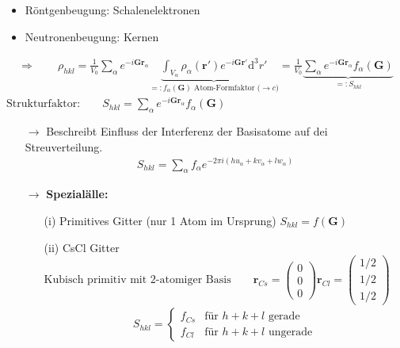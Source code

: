 \begin{itemize}
    \begin{itemize}
        \item Röntgenbeugung: Schalenelektronen
        \item Neutronenbeugung: Kernen
    \end{itemize}
    \begin{align*}
        \Rightarrow \qquad \rho_{hkl} = \frac{1}{V_0} \sum_{\alpha} e^{-i \textbf{G} \textbf{r}_{\alpha}} \underbrace{\int_{V_{\alpha}} \rho_{\alpha} (\textbf{r}') e^{-i \textbf{G} \textbf{r}'} \mathrm{d}^3r'}_{=: f_{\alpha} (\textbf{G})\text{ Atom-Formfaktor ($\rightarrow c$)}}  = \frac{1}{V_0} \underbrace{\sum_{\alpha} e^{-i \textbf{G} \textbf{r}_{\alpha}} f_{\alpha} (\textbf{G})}_{=: S_{hkl}}
    \end{align*}
    $\text{Strukturfaktor:} \qquad S_{hkl} = \sum_{\alpha} e^{-i \textbf{G} \textbf{r}_{\alpha}} f_{\alpha} (\textbf{G})$
        \begin{itemize}
        \item[$\rightarrow$] Beschreibt Einfluss der Interferenz der Basisatome auf dei Streuverteilung.
        \begin{align*}
            S_{hkl} = \sum_\alpha f_\alpha e^{-2\pi i (hu_\alpha+kv_\alpha+lw_\alpha)}
        \end{align*}
        \item[$\rightarrow$] \textbf{Spezialälle:}
        \begin{itemize}
            \item[(i)] Primitives Gitter (nur 1 Atom im Ursprung) $S_{hkl}=f(\textbf{G})$
            \item[(ii)] CsCl Gitter\\ $\text{Kubisch primitiv mit 2-atomiger Basis} \qquad \textbf{r}_{Cs}= \left(\begin{array}{c} 0 \\ 0 \\ 0 \end{array}\right) \textbf{r}_{Cl} = \left(\begin{array}{c} 1/2 \\ 1/2 \\ 1/2 \end{array}\right)$ 
            \begin{align*}
                S_{hkl} = \begin{cases}
                    f_{Cs} & \text{für $h+k+l$ gerade}\\
                    f_{Cl} & \text{für $h+k+l$ ungerade}
                \end{cases}
            \end{align*}


\end{itemize}
\end{itemize}
\end{itemize}
